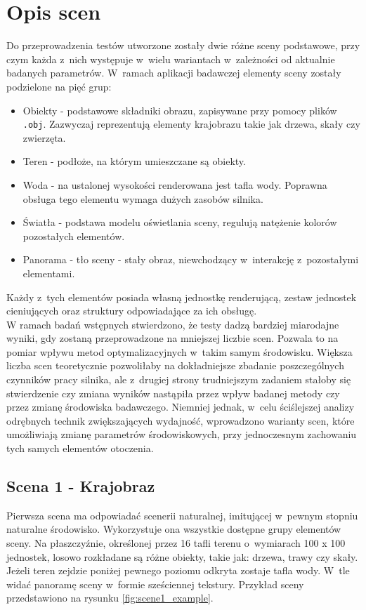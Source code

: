 \documentclass[a4paper,twoside,12pt]{book}
\begin{document}
\section{Opis scen}
Do przeprowadzenia testów utworzone zostały dwie różne sceny podstawowe, przy czym każda z~nich występuje w~wielu wariantach w~zależności od aktualnie badanych parametrów. W~ramach aplikacji badawczej elementy sceny zostały podzielone na pięć grup:
\begin{itemize}
    \item Obiekty - podstawowe składniki obrazu, zapisywane przy pomocy plików \texttt{.obj}. Zazwyczaj reprezentują elementy krajobrazu takie jak drzewa, skały czy zwierzęta.
    \item Teren - podłoże, na którym umieszczane są obiekty.
    \item Woda - na ustalonej wysokości renderowana jest tafla wody. Poprawna obsługa tego elementu wymaga dużych zasobów silnika.
    \item Światła - podstawa modelu oświetlania sceny, regulują natężenie kolorów pozostałych elementów.
    \item Panorama - tło sceny - stały obraz, niewchodzący w~interakcję z~pozostałymi elementami.
\end{itemize}
Każdy z~tych elementów posiada własną jednostkę renderującą, zestaw jednostek cieniujących oraz struktury odpowiadające za ich obsługę. \\
W ramach badań wstępnych stwierdzono, że testy dadzą bardziej miarodajne wyniki, gdy zostaną przeprowadzone na mniejszej liczbie scen. Pozwala to na pomiar wpływu metod optymalizacyjnych w~takim samym środowisku. Większa liczba scen teoretycznie pozwoliłaby na dokładniejsze zbadanie poszczególnych czynników pracy silnika, ale z~drugiej strony trudniejszym zadaniem stałoby się stwierdzenie czy zmiana wyników nastąpiła przez wpływ badanej metody czy przez zmianę środowiska badawczego. Niemniej jednak, w~celu ściślejszej analizy odrębnych technik zwiększających wydajność, wprowadzono warianty scen, które umożliwiają zmianę parametrów środowiskowych, przy jednoczesnym zachowaniu tych samych elementów otoczenia.

\subsection{Scena 1 - Krajobraz}
Pierwsza scena ma odpowiadać scenerii naturalnej, imitującej w~pewnym stopniu naturalne środowisko. Wykorzystuje ona wszystkie dostępne grupy elementów sceny. Na płaszczyźnie, określonej przez 16 tafli terenu o~wymiarach 100 x 100 jednostek, losowo rozkładane są różne obiekty, takie jak: drzewa, trawy czy skały. Jeżeli teren zejdzie poniżej pewnego poziomu odkryta zostaje tafla wody. W~tle widać panoramę sceny w~formie sześciennej tekstury. Przykład sceny przedstawiono na rysunku \ref{fig:scene1_example}. \\
\end{document}
